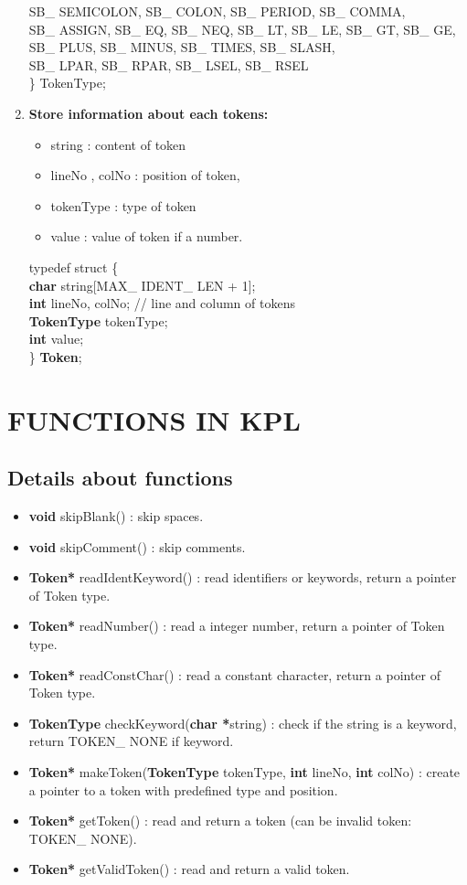 \documentclass[12pt, a4paper]{report}
\begin{document}
\begin{enumerate}
            SB\_ SEMICOLON, SB\_ COLON, SB\_ PERIOD, SB\_ COMMA,\\
            SB\_ ASSIGN, SB\_ EQ, SB\_ NEQ, SB\_ LT, SB\_ LE, SB\_ GT, SB\_ GE, \\
  	 SB\_ PLUS, SB\_ MINUS, SB\_ TIMES, SB\_ SLASH,\\
  	 SB\_ LPAR, SB\_ RPAR, SB\_ LSEL, SB\_ RSEL\\
       \} TokenType;
       			\item \textbf{Store information about each tokens:}
       				\begin{itemize}
       					\item string : content of token 
     					\item lineNo , colNo : position of  token, 
     					\item tokenType : type of token 
      					\item value : value of token if  a number.
					\end{itemize}
					typedef struct \{\\
           \textbf{char} string[MAX\_ IDENT\_ LEN + 1];\\
           \textbf{int} lineNo, colNo; // line and column of tokens\\
           \textbf{TokenType} tokenType;\\
           \textbf{int} value;\\
       \} \textbf{Token};      				  
			\end{enumerate}
		\section{FUNCTIONS IN KPL}
			\subsection{Details about functions}
				\begin{itemize}
					\item \textbf{void} skipBlank() : skip spaces.
      				\item \textbf{void} skipComment() : skip comments.
      				\item \textbf{Token*} readIdentKeyword() : read identifiers or keywords, return a pointer of Token type.
      				\item \textbf{Token*} readNumber() : read a integer number, return a pointer of Token type.
      				\item \textbf{Token*} readConstChar() : read a constant character, return a pointer of Token type.
      				\item \textbf{TokenType} checkKeyword(\textbf{char *}string) : check if the string is a keyword, return TOKEN\_ NONE if keyword.
      				\item \textbf{Token*} makeToken(\textbf{TokenType} tokenType, \textbf{int} lineNo, \textbf{int} colNo) : create a pointer to a token with predefined type and position.
      				\item \textbf{Token*} getToken() : read and return a token (can be invalid token: TOKEN\_ NONE).
          			\item \textbf{Token*} getValidToken() : read and return a valid token.
				\end{itemize}
\end{document}
